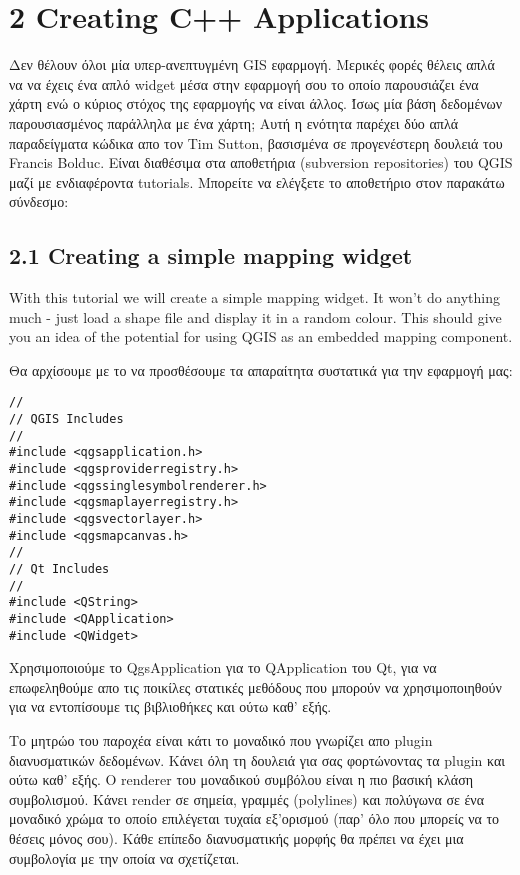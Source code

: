 \section{2 Creating C++ Applications}

Δεν θέλουν όλοι μία υπερ-ανεπτυγμένη GIS εφαρμογή. Μερικές φορές θέλεις απλά να να έχεις ένα απλό widget μέσα στην εφαρμογή σου το οποίο παρουσιάζει ένα χάρτη ενώ ο κύριος στόχος της εφαρμογής να είναι άλλος. Ίσως μία βάση δεδομένων παρουσιασμένος παράλληλα με ένα χάρτη;  Αυτή η ενότητα παρέχει δύο απλά παραδείγματα κώδικα απο τον Tim Sutton, βασισμένα σε προγενέστερη δουλειά του Francis Bolduc. Είναι διαθέσιμα στα αποθετήρια (subversion repositories) του QGIS μαζί με ενδιαφέροντα tutorials. Μπορείτε να ελέγξετε το αποθετήριο στον παρακάτω σύνδεσμο: 

\subsection{2.1 Creating a simple mapping widget}\label{subsec:simple_widget}

With this tutorial we will create a simple mapping widget. It won't do 
anything much - just load a shape file and display it in a random colour. 
This should give you an idea of the potential for using QGIS as an embedded
mapping component.

Θα αρχίσουμε με το να προσθέσουμε τα απαραίτητα συστατικά για την εφαρμογή μας:

\begin{verbatim}
//
// QGIS Includes
//
#include <qgsapplication.h>
#include <qgsproviderregistry.h>
#include <qgssinglesymbolrenderer.h>
#include <qgsmaplayerregistry.h>
#include <qgsvectorlayer.h>
#include <qgsmapcanvas.h>
//
// Qt Includes
//
#include <QString>
#include <QApplication>
#include <QWidget>
\end{verbatim}

Χρησιμοποιούμε το QgsApplication για το QΑpplication του Qt, για να επωφεληθούμε απο τις ποικίλες στατικές μεθόδους που μπορούν να χρησιμοποιηθούν για να εντοπίσουμε τις βιβλιοθήκες και ούτω καθ' εξής. 

Το μητρώο του παροχέα είναι κάτι το μοναδικό που γνωρίζει απο plugin διανυσματικών δεδομένων. Κάνει όλη τη δουλειά για σας φορτώνοντας τα plugin και ούτω καθ' εξής. O renderer του μοναδικού συμβόλου είναι η πιο βασική κλάση συμβολισμού. Κάνει render σε σημεία, γραμμές (polylines) και πολύγωνα σε ένα μοναδικό χρώμα το οποίο επιλέγεται τυχαία εξ'ορισμού (παρ' όλο που μπορείς να το θέσεις μόνος σου). Κάθε επίπεδο διανυσματικής μορφής θα πρέπει να έχει μια συμβολογία με την οποία να σχετίζεται. 

